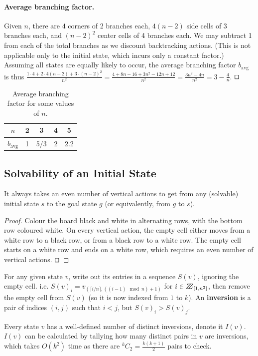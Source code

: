 \documentclass[runningheads]{llncs}
\begin{document}
\paragraph{Average branching factor.} Given $n$, there are $4$ corners of 2 branches each, $4(n-2)$ side cells of 3 branches each, and $(n-2)^2$ center cells of 4 branches each. We may subtract 1 from each of the total branches as we discount backtracking actions. (This is not applicable only to the initial state, which incurs only a constant factor.) Assuming all states are equally likely to occur, the average branching factor $b_\text{avg}$ is thus $\frac{1\cdot 4 + 2\cdot 4(n-2) + 3\cdot (n-2)^2}{n^2} = \frac{4 + 8n - 16 + 3n^2 - 12n + 12}{n^2} = \frac{3n^2 - 4n}{n^2} = 3 - \frac{4}{n}$. $\qed$

\begin{table}[h]
\centering
\caption{Average branching factor for some values of $n$.}
\label{tab:results}
\begin{tabular}{|c||c|c|c|c|} \hline
$n$            & 2 &   3 & 4 & 5 \\ \hline
$b_\text{avg}$ & 1 & 5/3 & 2 & 2.2 \\ \hline
\end{tabular}
\end{table}

\subsection{Solvability of an Initial State \cite{Solvability}}
\label{subsec:solvability}
\begin{lemma}\label{lem:evennumofvertactions}
It always takes an even number of vertical actions to get from any (solvable) initial state $s$ to the goal state $g$ (or equivalently, from $g$ to $s$).
\end{lemma}
\begin{proof}
Colour the board black and white in alternating rows, with the bottom row coloured white. On every vertical action, the empty cell either moves from a white row to a black row, or from a black row to a white row. The empty cell starts on a white row and ends on a white row, which requires an even number of vertical actions. $\qed$
\end{proof}

\begin{definition}\label{def:inversion}
For any given state $v$, write out its entries in a sequence $S(v)$, ignoring the empty cell. i.e. $S(v)_i = v_{(\lceil i/n\rceil, ((i-1) \mod n) +1)}$ for $i \in \bbbz_{[1,n^2]}$, then remove the empty cell from $S(v)$ (so it is now indexed from $1$ to $k$). An \textbf{inversion} is a pair of indices $(i,j)$ such that $i < j$, but $S(v)_i > S(v)_j$.
\end{definition}
Every state $v$ has a well-defined number of distinct inversions, denote it $I(v)$. $I(v)$ can be calculated by tallying how many distinct pairs in $v$ are inversions, which takes $O(k^2)$ time as there are $^kC_2 = \frac{k(k+1)}{2}$ pairs to check.
\end{document}
